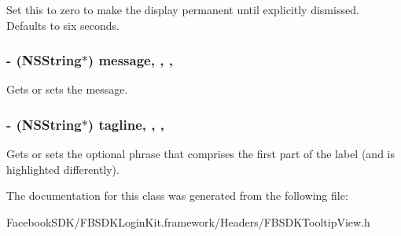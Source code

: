 Set this to zero to make the display permanent until explicitly dismissed. Defaults to six seconds. \hypertarget{interface_f_b_s_d_k_tooltip_view_af6b9bdb1ec818c555c7cde749f22d62c}{
\subsubsection[{message}]{\setlength{\rightskip}{0pt plus 5cm}-\/ (N\-S\-String$\ast$) message\hspace{0.3cm}{\ttfamily [read]}, {\ttfamily [write]}, {\ttfamily [nonatomic]}, {\ttfamily [copy]}}}\label{interface_f_b_s_d_k_tooltip_view_af6b9bdb1ec818c555c7cde749f22d62c}
Gets or sets the message. \hypertarget{interface_f_b_s_d_k_tooltip_view_a48a5512acd97a1af6fbf64e2689e21e2}{
\subsubsection[{tagline}]{\setlength{\rightskip}{0pt plus 5cm}-\/ (N\-S\-String$\ast$) tagline\hspace{0.3cm}{\ttfamily [read]}, {\ttfamily [write]}, {\ttfamily [nonatomic]}, {\ttfamily [copy]}}}\label{interface_f_b_s_d_k_tooltip_view_a48a5512acd97a1af6fbf64e2689e21e2}
Gets or sets the optional phrase that comprises the first part of the label (and is highlighted differently). 

The documentation for this class was generated from the following file\-:\begin{DoxyCompactItemize}
\item 
Facebook\-S\-D\-K/\-F\-B\-S\-D\-K\-Login\-Kit.\-framework/\-Headers/F\-B\-S\-D\-K\-Tooltip\-View.\-h\end{DoxyCompactItemize}
